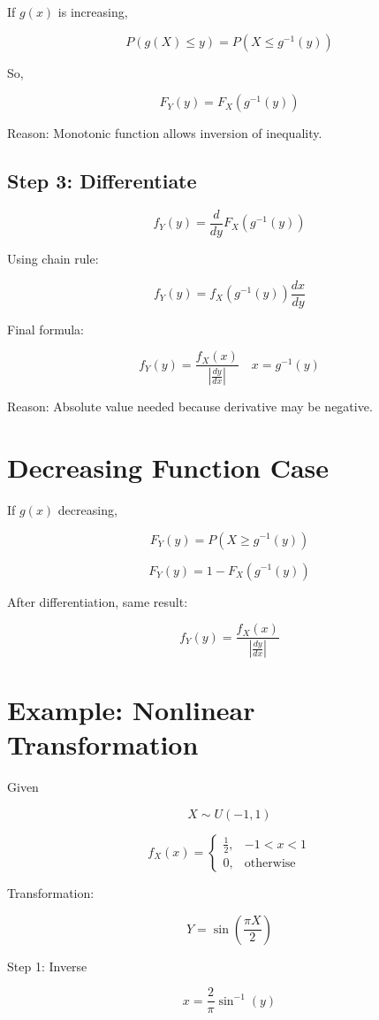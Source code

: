 \documentclass[12pt]{article}
\begin{document}
If $g(x)$ is increasing,

\[
P(g(X) \le y) = P(X \le g^{-1}(y))
\]

So,

\[
F_Y(y) = F_X(g^{-1}(y))
\]

Reason:
Monotonic function allows inversion of inequality.

\subsection{Step 3: Differentiate}

\[
f_Y(y) =
\frac{d}{dy} F_X(g^{-1}(y))
\]

Using chain rule:

\[
f_Y(y) =
f_X(g^{-1}(y))
\frac{dx}{dy}
\]

Final formula:

\[
f_Y(y) =
\frac{f_X(x)}
{\left|\frac{dy}{dx}\right|}
\quad x = g^{-1}(y)
\]

Reason:
Absolute value needed because derivative may be negative.

\section{Decreasing Function Case}

If $g(x)$ decreasing,

\[
F_Y(y) = P(X \ge g^{-1}(y))
\]

\[
F_Y(y) =
1 - F_X(g^{-1}(y))
\]

After differentiation, same result:

\[
f_Y(y) =
\frac{f_X(x)}
{\left|\frac{dy}{dx}\right|}
\]

\section{Example: Nonlinear Transformation}

Given

\[
X \sim U(-1,1)
\]

\[
f_X(x) =
\begin{cases}
\frac12, & -1 < x < 1 \\
0, & \text{otherwise}
\end{cases}
\]

Transformation:

\[
Y = \sin\left(\frac{\pi X}{2}\right)
\]

Step 1: Inverse

\[
x = \frac{2}{\pi} \sin^{-1}(y)
\]
\end{document}

